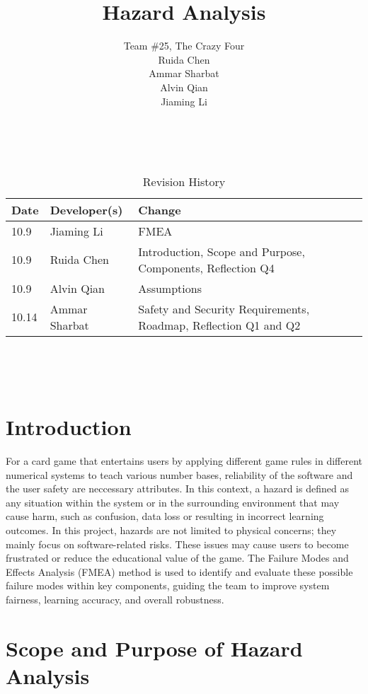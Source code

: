 \documentclass{article}
\title{Hazard Analysis\\\progname}
\author{
    Team \#25, The Crazy Four \\[1ex]
    Ruida Chen \\
    Ammar Sharbat \\
    Alvin Qian \\
    Jiaming Li
}
\date{}
\begin{document}
\maketitle
\thispagestyle{empty}

~\newpage


\begin{table}[hp]
\caption{Revision History} \label{TblRevisionHistory}
\begin{tabularx}{\textwidth}{llX}
\toprule
\textbf{Date} & \textbf{Developer(s)} & \textbf{Change}\\
\midrule
10.9 & Jiaming Li & FMEA\\
10.9 & Ruida Chen & Introduction, Scope and Purpose, Components, Reflection Q4\\
10.9 & Alvin Qian & Assumptions\\
10.14 & Ammar Sharbat & Safety and Security Requirements, Roadmap, Reflection Q1 and Q2\\
\bottomrule
\end{tabularx}
\end{table}

~\newpage

\tableofcontents

~\newpage



\section{Introduction}

For a card game that entertains users by applying different game rules in different numerical systems to teach various number bases, reliability of the software and the user safety are neccessary attributes. In this context, a hazard is defined as any situation within the system or in the surrounding environment that may cause harm, such as confusion, data loss or resulting in incorrect learning outcomes. In this project, hazards are not limited to physical concerns; they mainly focus on software-related risks. These issues may cause users to become frustrated or reduce the educational value of the game. The Failure Modes and Effects Analysis (FMEA) method is used to identify and evaluate these possible failure modes within key components, guiding the team to improve system fairness, learning accuracy, and overall robustness.

\section{Scope and Purpose of Hazard Analysis}
\end{document}

